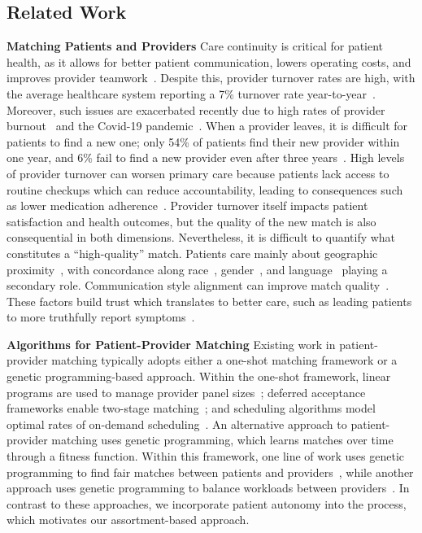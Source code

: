 \documentclass[11pt]{article}
\begin{document}
\subsection{Related Work}
    \textbf{Matching Patients and Providers} 
Care continuity is critical for patient health, as it allows for better patient communication, lowers operating costs, and improves provider teamwork~\citep{lower_turnover}. 
Despite this, provider turnover rates are high, with the average healthcare system reporting a 7\% turnover rate year-to-year~\citep{lower_turnover}. 
Moreover, such issues are exacerbated recently due to high rates of provider burnout~\citep{provider_burnout} and the Covid-19 pandemic~\citep{provider_burnout_covid19}. 
When a provider leaves, it is difficult for patients to find a new one; only 54\% of patients find their new provider within one year, and 6\% fail to find a new provider even after three years~\citep{finding_new_provider}. 
High levels of provider turnover can worsen primary care because patients lack access to routine checkups which can reduce accountability, leading to consequences such as lower medication adherence~\citep{pcp_turnover,importance_primary_care,race_concordance_adherence,concordance_race_cardio}. 
Provider turnover itself impacts patient satisfaction and health outcomes, but the quality of the new match is also consequential in both dimensions. Nevertheless, it is difficult to quantify what constitutes a ``high-quality'' match. Patients care mainly about geographic proximity~\citep{patient_decisions}, with concordance along race~\citep{race_concordance}, gender~\citep{gender_concordance}, and language~\citep{language_concordance} playing a secondary role. 
Communication style alignment can improve match quality~\citep{personal_factor_concordance}. These factors build trust which translates to better care, such as leading patients to more truthfully report symptoms~\citep{race_concordance_lung}. 

\textbf{Algorithms for Patient-Provider Matching}
Existing work in patient-provider matching typically adopts either a one-shot matching framework or a genetic programming-based approach. 
Within the one-shot framework, linear programs are used to manage provider panel sizes~\citep{panel_size_lp}; deferred acceptance frameworks enable two-stage matching~\citep{two_stage_matching}; and scheduling algorithms model optimal rates of on-demand scheduling~\citep{on_demand_percent}. 
An alternative approach to patient-provider matching uses genetic programming, which learns matches over time through a fitness function. 
Within this framework, one line of work uses genetic programming to find fair matches between patients and providers~\citep{two_stage_matching}, while another approach uses genetic programming to balance workloads between providers~\citep{genetic_non_dominated}. 
In contrast to these approaches, we incorporate patient autonomy into the process, which motivates our assortment-based approach. 
\end{document}
